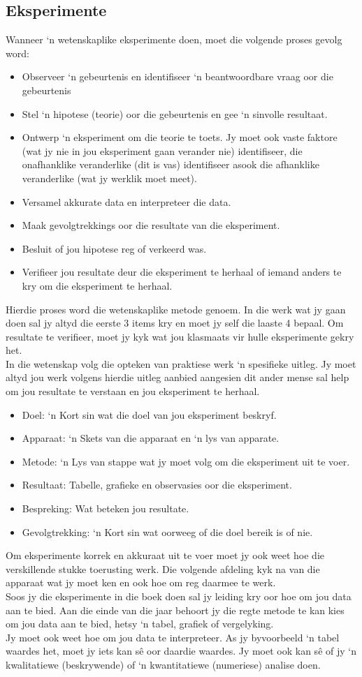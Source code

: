 \subsection*{Eksperimente}
Wanneer ‘n wetenskaplike eksperimente doen, moet die volgende proses gevolg word:
\begin{itemize}
\item Observeer ‘n gebeurtenis en identifiseer ‘n beantwoordbare vraag oor die gebeurtenis
\item Stel ‘n hipotese (teorie) oor die gebeurtenis en gee ‘n sinvolle resultaat.
\item Ontwerp ‘n eksperiment om die teorie te toets. Jy moet ook vaste faktore (wat jy nie in jou eksperiment gaan verander nie) identifiseer, die onafhanklike veranderlike (dit is vas) identifiseer asook die afhanklike veranderlike (wat jy werklik moet meet).
\item Versamel akkurate data en interpreteer die data.
\item Maak gevolgtrekkings oor die resultate van die eksperiment.
\item Besluit of jou hipotese reg of verkeerd was.
\item Verifieer jou resultate deur die eksperiment te herhaal of iemand anders te kry om die eksperiment te herhaal.
\end{itemize}
Hierdie proses word die wetenskaplike metode genoem. In die werk wat jy gaan doen sal jy altyd die eerste 3 items kry en moet jy self die laaste 4 bepaal. Om resultate te verifieer, moet jy kyk wat jou klasmaats vir hulle eksperimente gekry het. \\
In die wetenskap volg die opteken van praktiese werk ‘n spesifieke uitleg. Jy moet altyd jou werk volgens hierdie uitleg aanbied aangesien dit ander mense sal help om jou resultate te verstaan en jou eksperiment te herhaal.
\begin{itemize}
\item Doel: ‘n Kort sin wat die doel van jou eksperiment beskryf.
\item Apparaat: ‘n Skets van die apparaat en ‘n lys van apparate.
\item Metode: ‘n Lys van stappe wat jy  moet volg om die eksperiment uit te voer.
\item Resultaat: Tabelle, grafieke en observasies oor die eksperiment.
\item Bespreking: Wat beteken jou resultate.
\item Gevolgtrekking: ‘n Kort sin wat oorweeg of die doel bereik is of nie.
\end{itemize}
Om eksperimente korrek en akkuraat uit te voer moet jy ook weet hoe die verskillende stukke toerusting werk. Die volgende afdeling kyk na van die apparaat wat jy moet ken en ook hoe om reg daarmee te werk. \\
Soos jy die eksperimente in die boek doen sal jy leiding kry oor hoe om jou data aan te bied. Aan die einde van die jaar behoort jy die regte metode te kan kies om jou data aan te bied, hetsy ‘n tabel, grafiek of vergelyking.\\
Jy moet ook weet hoe om jou data te interpreteer. As jy byvoorbeeld ‘n tabel waardes het, moet jy iets kan sê oor daardie waardes. Jy moet ook kan sê of jy ‘n kwalitatiewe (beskrywende) of ‘n kwantitatiewe (numeriese) analise doen.
